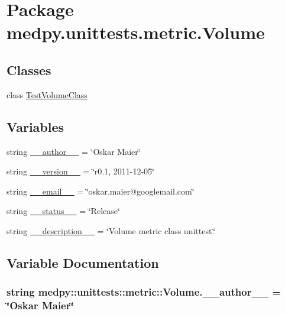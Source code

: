 \hypertarget{namespacemedpy_1_1unittests_1_1metric_1_1Volume}{
\section{Package medpy.unittests.metric.Volume}
\label{namespacemedpy_1_1unittests_1_1metric_1_1Volume}
}
\subsection*{Classes}
\begin{DoxyCompactItemize}
\item 
class \hyperlink{classmedpy_1_1unittests_1_1metric_1_1Volume_1_1TestVolumeClass}{TestVolumeClass}
\end{DoxyCompactItemize}
\subsection*{Variables}
\begin{DoxyCompactItemize}
\item 
string \hyperlink{namespacemedpy_1_1unittests_1_1metric_1_1Volume_ad7026e932505a7b39f0a3379d26b39dc}{\_\-\_\-author\_\-\_\-} = \char`\"{}Oskar Maier\char`\"{}
\item 
string \hyperlink{namespacemedpy_1_1unittests_1_1metric_1_1Volume_a29ede6385cb19ddea103d60ad57c4ba0}{\_\-\_\-version\_\-\_\-} = \char`\"{}r0.1, 2011-\/12-\/05\char`\"{}
\item 
string \hyperlink{namespacemedpy_1_1unittests_1_1metric_1_1Volume_ac7806f4f1a65b4e3cbb11b20406b42c0}{\_\-\_\-email\_\-\_\-} = \char`\"{}oskar.maier@googlemail.com\char`\"{}
\item 
string \hyperlink{namespacemedpy_1_1unittests_1_1metric_1_1Volume_a414da00473eaf2259adffe26e62b066b}{\_\-\_\-status\_\-\_\-} = \char`\"{}Release\char`\"{}
\item 
string \hyperlink{namespacemedpy_1_1unittests_1_1metric_1_1Volume_a417c0b3e0198bf398c42b5ca0cde7bb1}{\_\-\_\-description\_\-\_\-} = \char`\"{}Volume metric class unittest.\char`\"{}
\end{DoxyCompactItemize}


\subsection{Variable Documentation}
\hypertarget{namespacemedpy_1_1unittests_1_1metric_1_1Volume_ad7026e932505a7b39f0a3379d26b39dc}{
\subsubsection[{\_\-\_\-author\_\-\_\-}]{\setlength{\rightskip}{0pt plus 5cm}string {\bf medpy::unittests::metric::Volume.\_\-\_\-author\_\-\_\-} = \char`\"{}Oskar Maier\char`\"{}}}
\label{namespacemedpy_1_1unittests_1_1metric_1_1Volume_ad7026e932505a7b39f0a3379d26b39dc}


